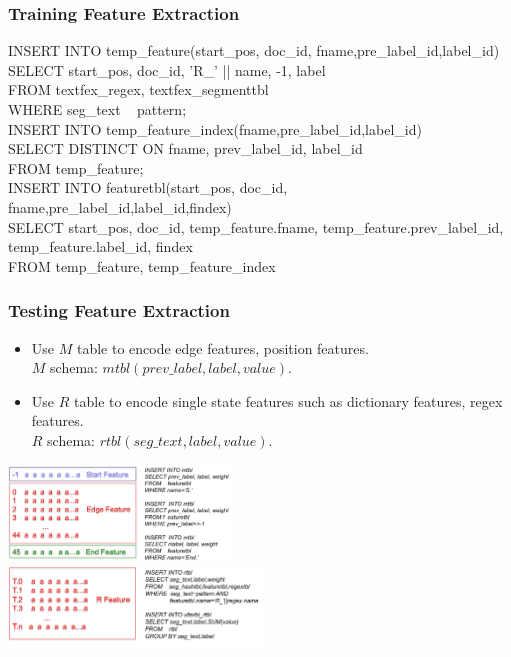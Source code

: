 \documentclass{beamer}
\begin{document}
\begin{frame}
  \frametitle{Training Feature Extraction}
  INSERT INTO temp_feature(start_pos, doc_id, fname,pre_label_id,label_id)\\ 
                        SELECT start_pos, doc_id, 'R_' || name, -1, label\\
                        FROM   textfex_regex, textfex_segmenttbl\\
                        WHERE  seg_text ~ pattern;\\
  INSERT INTO temp_feature_index(fname,pre_label_id,label_id)\\ 
                        SELECT DISTINCT ON fname, prev_label_id, label_id\\
                        FROM   temp_feature;\\
  INSERT INTO featuretbl(start_pos, doc_id, fname,pre_label_id,label_id,findex)\\
                        SELECT start_pos, doc_id, temp_feature.fname, temp_feature.prev_label_id, temp_feature.label_id, findex\\
                        FROM   temp_feature, temp_feature_index\\
 
\end{frame}


\begin{frame}
  \frametitle{Testing Feature Extraction}
  \begin{itemize}
  \item Use $M$ table to encode edge features, position features. \\
  $M$ schema: $mtbl(prev\_label,label,value)$.
  \item Use $R$ table to encode single state features such as dictionary features, regex features.\\ 
  $R$ schema: $rtbl(seg\_text,label,value)$. \\
  \end{itemize}
  \includegraphics[height=7.02em]{m.png}\\
  \includegraphics[height=5.85em]{r.png}\\
\end{frame}
\end{document}
